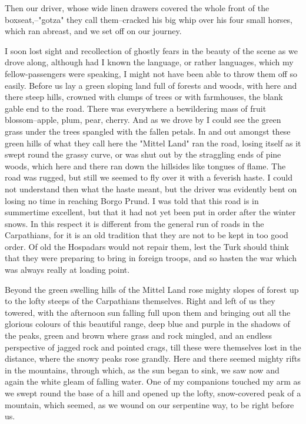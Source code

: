 Then our driver, whose wide linen drawers covered the whole front of the boxseat,--"gotza" they call them--cracked his big whip over his four small horses, which ran abreast, and we set off on our journey. 

I soon lost sight and recollection of ghostly fears in the beauty of the scene as we drove along, although had I known the language, or rather languages, which my fellow-passengers were speaking, I might not have been able to throw them off so easily. Before us lay a green sloping land full of forests and woods, with here and there steep hills, crowned with clumps of trees or with farmhouses, the blank gable end to the road. There was everywhere a bewildering mass of fruit blossom--apple, plum, pear, cherry. And as we drove by I could see the green grass under the trees spangled with the fallen petals. In and out amongst these green hills of what they call here the "Mittel Land" ran the road, losing itself as it swept round the grassy curve, or was shut out by the straggling ends of pine woods, which here and there ran down the hillsides like tongues of flame. The road was rugged, but still we seemed to fly over it with a feverish haste. I could not understand then what the haste meant, but the driver was evidently bent on losing no time in reaching Borgo Prund. I was told that this road is in summertime excellent, but that it had not yet been put in order after the winter snows. In this respect it is different from the general run of roads in the Carpathians, for it is an old tradition that they are not to be kept in too good order. Of old the Hospadars would not repair them, lest the Turk should think that they were preparing to bring in foreign troops, and so hasten the war which was always really at loading point. 

Beyond the green swelling hills of the Mittel Land rose mighty slopes of forest up to the lofty steeps of the Carpathians themselves. Right and left of us they towered, with the afternoon sun falling full upon them and bringing out all the glorious colours of this beautiful range, deep blue and purple in the shadows of the peaks, green and brown where grass and rock mingled, and an endless perspective of jagged rock and pointed crags, till these were themselves lost in the distance, where the snowy peaks rose grandly. Here and there seemed mighty rifts in the mountains, through which, as the sun began to sink, we saw now and again the white gleam of falling water. One of my companions touched my arm as we swept round the base of a hill and opened up the lofty, snow-covered peak of a mountain, which seemed, as we wound on our serpentine way, to be right before us. 

